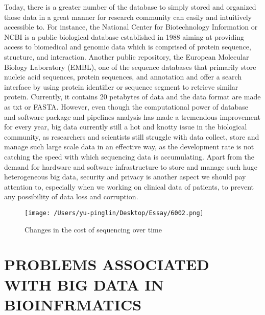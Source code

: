 \documentclass[12pt]{article}
\begin{document}
Today, there is a greater number of the database to simply stored and organized those data in a  great manner for research community can easily and intuitively accessible to. For instance, the National Center for Biotechnology Information or NCBI is a public biological database established in 1988 aiming at providing access to biomedical and genomic data which is comprised of protein sequence, structure, and interaction. Another public repository, the European Molecular Biology Laboratory (EMBL), one of the sequence databases that primarily store nucleic acid sequences, protein sequences, and annotation and offer a search interface by using protein identifier or sequence segment to retrieve similar protein. Currently, it contains 20 petabytes of data and the data format are made as txt or FASTA. However, even though the computational power of database and software package and pipelines analysis has made a tremendous improvement for every year, big data currently still a hot and knotty issue in the biological community, as researchers and scientists still struggle with data collect, store and manage such large scale data in an effective way, as the development rate is not catching the speed with which sequencing data is accumulating. Apart from the demand for hardware and software infrastructure to store and manage such huge heterogeneous big data, security and privacy is another aspect we should pay attention to, especially when we working on clinical data of patients, to prevent any possibility of data loss and corruption.



\begin{figure}[H]
    \texttt{[image: /Users/yu-pinglin/Desktop/Essay/6002.png]}
    \centering
    \caption{Changes in the cost of sequencing over time}
\end{figure}
    
\section{PROBLEMS ASSOCIATED WITH BIG DATA IN BIOINFRMATICS}
\end{document}
